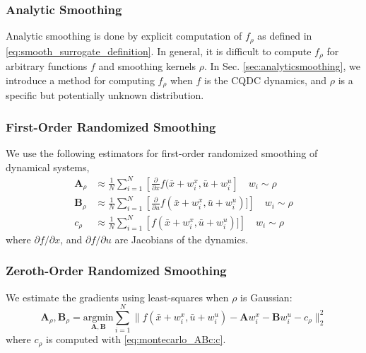 \subsubsection{Analytic Smoothing}
Analytic smoothing is done by explicit computation of $f_\rho$ as defined in \eqref{eq:smooth_surrogate_definition}. In general, it is difficult to compute $f_\rho$ for arbitrary functions $f$ and smoothing kernels $\rho$. In Sec. \ref{sec:analyticsmoothing}, we introduce a method for computing $f_\rho$ when $f$ is the CQDC dynamics, and $\rho$ is a specific but potentially unknown distribution.

\subsubsection{First-Order Randomized Smoothing}
We use the following estimators for first-order randomized smoothing of dynamical systems,
\begin{subequations}
\label{eq:montecarlo_ABc}
\begin{align}
\mathbf{A}_\rho & \approx \textstyle \frac{1}{N}\sum^N_{i=1} \left[\textstyle\frac{\partial}{\partial x}f(\bar{x}+w_i^x,\bar{u}+w_i^u\right] \quad w_i\sim \rho \label{eq:montecarlo_ABc:A} \\ 
\mathbf{B}_\rho & \approx \textstyle \frac{1}{N}\sum^N_{i=1} \left[\textstyle\frac{\partial}{\partial u}f(\bar{x}+w_i^x,\bar{u}+w_i^u)]\right] \quad w_i\sim \rho \\ 
c_\rho & \approx \textstyle \frac{1}{N}\sum^N_{i=1} \left[\textstyle f(\bar{x}+w_i^x,\bar{u}+w_i^u)]\right] \quad w_i\sim \rho \label{eq:montecarlo_ABc:c} 
\end{align}
\end{subequations}
where $\partial f/\partial x$, and $\partial f/\partial u$ are Jacobians of the dynamics.

\subsubsection{Zeroth-Order Randomized Smoothing}
We estimate the gradients using least-squares when $\rho$ is Gaussian:
\begin{equation}
\label{eq:montecarlo_ABc_zero}
\mathbf{A}_\rho,\mathbf{B}_\rho  = \underset{\mathbf{A,B}} {\text{argmin}}\textstyle\sum^N_{i=1}
 \| f(\bar{x}+w_i^x,\bar{u}+w_i^u) - \mathbf{A} w_i^x - \mathbf{B} w_i^u - c_\rho\|^2_2
\end{equation}
where $c_\rho$ is computed with \eqref{eq:montecarlo_ABc:c}.


